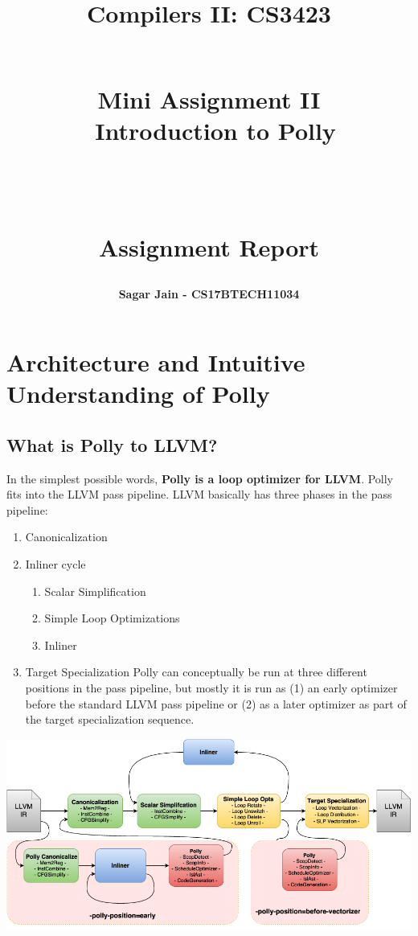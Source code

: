 \documentclass[a4paper,12pt]{report}
\begin{document}
\title{
\textbf{Compilers II: CS3423}\\~\\
\begin{large}
\textbf{Mini Assignment II\\~Introduction to Polly}\\~\\~\\
\end{large}
\begin{large}
\textbf{Assignment Report}
\end{large}
}
\author{\textbf{Sagar Jain - CS17BTECH11034}\\}
\maketitle
\begin{large}
\tableofcontents
\end{large}
\newpage
\section{Architecture and Intuitive Understanding of Polly}
\subsection{What is Polly to LLVM?}
In the simplest possible words, \textbf{Polly is a loop optimizer for LLVM}. Polly fits into the LLVM pass pipeline. LLVM basically has three phases in the pass pipeline:
\begin{enumerate}
\item Canonicalization
\item Inliner cycle
\begin{enumerate}
\item Scalar Simplification
\item Simple Loop Optimizations
\item Inliner
\end{enumerate}
\item Target Specialization
Polly can conceptually be run at three different positions in the pass pipeline, but mostly it is run as (1) an early optimizer before the standard LLVM pass pipeline or (2) as a later optimizer as part of the target specialization sequence.
\end{enumerate}
\begin{center}
\includegraphics[scale=0.45]{llvm-passes.png}
~\\
\end{center}
\end{document}
